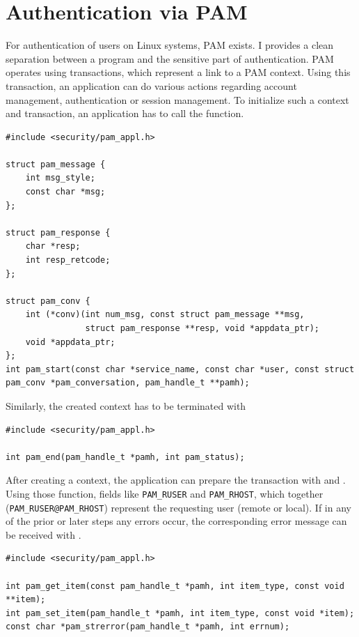 \documentclass[10pt,a4paper,titlepage,twoside,english,final]{zhawreprt}
\begin{document}
\section{Authentication via PAM}\label{sec:DesignAuthViaPAM}
For authentication of users on Linux systems, \gls{PAM} exists.
I provides a clean separation between a program and the sensitive part of authentication.
\gls{PAM} operates using transactions, which represent a link to a \gls{PAM} context.
Using this transaction, an application can do various actions regarding account management, authentication or session management.
To initialize such a context and transaction, an application has to call the \cite{pam_start} function.
\setlistingC
\begin{lstlisting}[caption={Initializing a \gls{PAM} context},label=lst:InitPAMContext]
#include <security/pam_appl.h>

struct pam_message {
    int msg_style;
    const char *msg;
};

struct pam_response {
    char *resp;
    int resp_retcode;
};

struct pam_conv {
    int (*conv)(int num_msg, const struct pam_message **msg,
                struct pam_response **resp, void *appdata_ptr);
    void *appdata_ptr;
};
int pam_start(const char *service_name, const char *user, const struct pam_conv *pam_conversation, pam_handle_t **pamh);
\end{lstlisting}

Similarly, the created context has to be terminated with \cite{pam_end}
\setlistingC
\begin{lstlisting}[caption={Terminating a \gls{PAM} context},label=lst:TermPAMContext]
#include <security/pam_appl.h>

int pam_end(pam_handle_t *pamh, int pam_status);
\end{lstlisting}

After creating a context, the application can prepare the transaction with \cite{pam_set_item} and \cite{pam_get_item}.
Using those function, fields like \texttt{PAM\_RUSER} and \texttt{PAM\_RHOST}, which together (\texttt{PAM\_RUSER@PAM\_RHOST}) represent the requesting user (remote or local).
If in any of the prior or later steps any errors occur, the corresponding error message can be received with \cite{pam_strerror}.
\setlistingC
\begin{lstlisting}[caption={\gls{PAM} functions},label=lst:PAMFunctions]
#include <security/pam_appl.h>

int pam_get_item(const pam_handle_t *pamh, int item_type, const void **item);
int pam_set_item(pam_handle_t *pamh, int item_type, const void *item);
const char *pam_strerror(pam_handle_t *pamh, int errnum);
\end{lstlisting}
\end{document}
